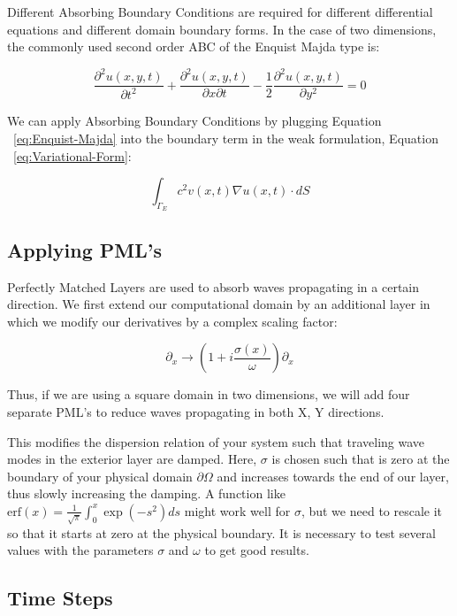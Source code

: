 Different Absorbing Boundary Conditions are required for different differential equations and different domain boundary forms. In the case of two dimensions, the commonly used second order ABC of the Enquist Majda type is:

\begin{equation}
\frac{\partial^2 u(x,y,t)}{\partial t^2} + \frac{\partial^2 u(x,y,t)}{\partial x \partial t} - \frac{1}{2} \frac{\partial^2 u(x,y,t)}{\partial y^2} = 0
\label{eq:Enquist-Majda}
\end{equation}

We can apply Absorbing Boundary Conditions by plugging Equation ~\ref{eq:Enquist-Majda} into the boundary term in the weak formulation, Equation ~\ref{eq:Variational-Form}:

\begin{equation}
\int_{\Gamma_E} c^2 v(x,t) \nabla u(x,t) \cdot dS
\end{equation}



\subsection{Applying PML's}

Perfectly Matched Layers are used to absorb waves propagating in a certain direction. We first extend our computational domain by an additional layer in which we modify our derivatives by a complex scaling factor:

\begin{equation}
\partial_x \rightarrow \left( 1 + i \frac{\sigma(x)}{\omega} \right) \partial_x
\end{equation}

Thus, if we are using a square domain in two dimensions, we will add four separate PML's to reduce waves propagating in both X, Y directions.

This modifies the dispersion relation of your system such that traveling wave modes in the exterior layer are damped. Here, $\sigma$ is chosen such that is zero at the boundary of your physical domain $\partial \Omega$ and increases towards the end of our layer, thus slowly increasing the damping. A function like $\text{erf}(x)=\frac{1}{\sqrt{\pi}}\int_0^x \exp(-s^2) ds$ might work well for $\sigma$, but we need to rescale it so that it starts at zero at the physical boundary. It is necessary to test several values with the parameters $\sigma$ and $\omega$ to get good results.

\subsection{Time Steps}

